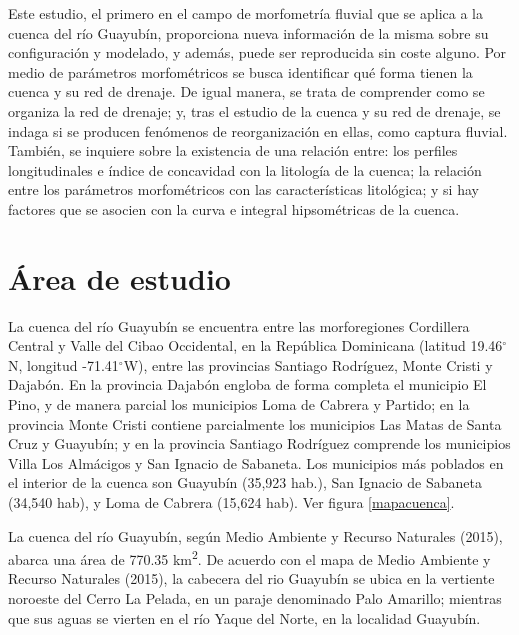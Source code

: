 \documentclass[11pt,]{article}
\begin{document}
Este estudio, el primero en el campo de morfometría fluvial que se
aplica a la cuenca del río Guayubín, proporciona nueva información de la
misma sobre su configuración y modelado, y además, puede ser reproducida
sin coste alguno. Por medio de parámetros morfométricos se busca
identificar qué forma tienen la cuenca y su red de drenaje. De igual
manera, se trata de comprender como se organiza la red de drenaje; y,
tras el estudio de la cuenca y su red de drenaje, se indaga si se
producen fenómenos de reorganización en ellas, como captura fluvial.
También, se inquiere sobre la existencia de una relación entre: los
perfiles longitudinales e índice de concavidad con la litología de la
cuenca; la relación entre los parámetros morfométricos con las
características litológica; y si hay factores que se asocien con la
curva e integral hipsométricas de la cuenca.

\section{Área de estudio}\label{uxe1rea-de-estudio}

La cuenca del río Guayubín se encuentra entre las morforegiones
Cordillera Central y Valle del Cibao Occidental, en la República
Dominicana (latitud 19.46\(^\circ\)N, longitud -71.41\(^\circ\)W), entre
las provincias Santiago Rodríguez, Monte Cristi y Dajabón. En la
provincia Dajabón engloba de forma completa el municipio El Pino, y de
manera parcial los municipios Loma de Cabrera y Partido; en la provincia
Monte Cristi contiene parcialmente los municipios Las Matas de Santa
Cruz y Guayubín; y en la provincia Santiago Rodríguez comprende los
municipios Villa Los Almácigos y San Ignacio de Sabaneta. Los municipios
más poblados en el interior de la cuenca son Guayubín (35,923 hab.), San
Ignacio de Sabaneta (34,540 hab), y Loma de Cabrera (15,624 hab). Ver
figura \ref {mapacuenca}.

La cuenca del río Guayubín, según Medio Ambiente y Recurso Naturales
(2015), abarca una área de 770.35 km\textsuperscript{2}. De acuerdo con
el mapa de Medio Ambiente y Recurso Naturales (2015), la cabecera del
rio Guayubín se ubica en la vertiente noroeste del Cerro La Pelada, en
un paraje denominado Palo Amarillo; mientras que sus aguas se vierten en
el río Yaque del Norte, en la localidad Guayubín.
\end{document}
